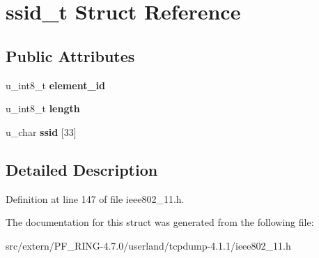 \hypertarget{structssid__t}{
\section{ssid\_\-t Struct Reference}
\label{structssid__t}
}
\subsection*{Public Attributes}
\begin{DoxyCompactItemize}
\item 
\hypertarget{structssid__t_ac592e6f270fa78d41bb9e0f96d45fdb9}{
u\_\-int8\_\-t {\bfseries element\_\-id}}
\label{structssid__t_ac592e6f270fa78d41bb9e0f96d45fdb9}

\item 
\hypertarget{structssid__t_a854800658db0e708848991b13367b716}{
u\_\-int8\_\-t {\bfseries length}}
\label{structssid__t_a854800658db0e708848991b13367b716}

\item 
\hypertarget{structssid__t_aaa108c6c876b13f7365a3800f5e8dc5f}{
u\_\-char {\bfseries ssid} \mbox{[}33\mbox{]}}
\label{structssid__t_aaa108c6c876b13f7365a3800f5e8dc5f}

\end{DoxyCompactItemize}


\subsection{Detailed Description}


Definition at line 147 of file ieee802\_\-11.h.



The documentation for this struct was generated from the following file:\begin{DoxyCompactItemize}
\item 
src/extern/PF\_\-RING-\/4.7.0/userland/tcpdump-\/4.1.1/ieee802\_\-11.h\end{DoxyCompactItemize}
